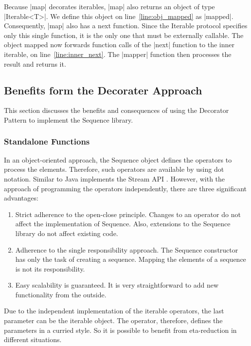 Because |map| decorates iterables, |map| also returns an object of type |Iterable<T>|. 
We define this object on line~\ref{line:obj_mapped} as |mapped|. 
Consequently, |map| also has a next function. Since the Iterable protocol 
specifies only this single function, it is the only one that must be externally 
callable. The object mapped now forwards function calls of the |next| function to 
the inner iterable, on line~\ref{line:inner_next}. The |mapper| function then 
processes the result and returns it.

\subsection{Benefits form the Decorater Approach}
\label{sub:Benefits form the Decorater Approach}
This section discusses the benefits and consequences of using the Decorator 
Pattern to implement the Sequence library.

\subsubsection{Standalone Functions}
\label{subsub:Standalone Functions}
In an object-oriented approach, the Sequence object defines the operators to 
process the elements. Therefore, such operators are available by using dot notation. 
Similar to Java implements the Stream API \cite{noauthor_stream_nodate}. 
However, with the approach of programming the operators independently, there 
are three significant advantages:

\begin{enumerate}
  \item {Strict adherence to the open-close principle. Changes to an operator do
      not affect the implementation of Sequence. Also, extensions to the 
      Sequence library do not affect existing code.
    }
  \item{Adherence to the single responsibility approach. The Sequence 
      constructor has only the task of creating a sequence. Mapping the
    elements of a sequence is not its responsibility.
  }
  \item{Easy scalability is guaranteed. It is very straightforward to add new 
    functionality from the outside.
  }
\end{enumerate}

Due to the independent implementation of the iterable operators, the last 
parameter can be the iterable object. The operator, therefore, defines the 
parameters in a curried style. So it is possible to benefit from eta-reduction 
in different situations.

